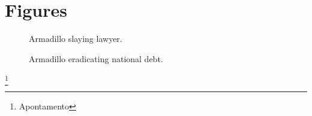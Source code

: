 \chapter*{Figures}
\vspace*{-3in}
\begin{figure}
	\vspace{2.4in}
	\caption{Armadillo slaying lawyer.}
	\label{arm:fig1}
\end{figure}
\clearpage
\newpage
\begin{figure}
	\vspace{2.4in}
	\caption{Armadillo eradicating national debt.}
	\label{arm:fig2}
\end{figure}
\clearpage
\newpage
\appendix
\cite{*}


\newpage
\footnote{Apontamento}


